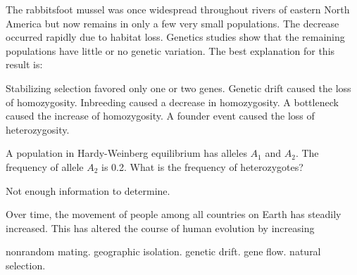 \question
The rabbitsfoot mussel was once widespread throughout rivers of eastern North America but now remains in only a few very small populations. The decrease occurred rapidly due to habitat loss. Genetics studies show that the remaining populations have little or no genetic variation. The best explanation for this result is:

\begin{choices}
\choice Stabilizing selection favored only one or two genes. %
\choice Genetic drift caused the loss of homozygosity. %
\choice Inbreeding caused a decrease in homozygosity. %
\correctchoice A bottleneck caused the increase of homozygosity. %
\choice A founder event caused the loss of heterozygosity. %
\end{choices}

\question
A population in Hardy-Weinberg equilibrium has alleles \textit{$A_1$} and \textit{$A_2$}. The frequency of allele \textit{$A_2$} is 0.2. What is the frequency of heterozygotes? 

\begin{choices}
\choice Not enough information to determine. %
\end{choices}

\question
Over time, the movement of people among all countries on Earth has steadily increased. This has altered the course of human evolution by increasing

\begin{choices}
	\choice nonrandom mating. %
	\choice geographic isolation. %
	\choice genetic drift. %
	\correctchoice gene flow. %
	\choice natural selection. %
\end{choices}
